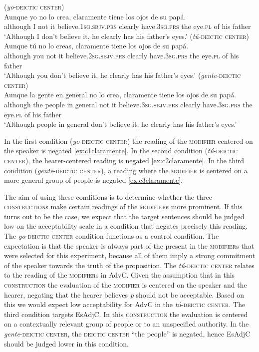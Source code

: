 \ea 
\ea\label{ex:c1claramente} (\textit{yo}-\textsc{deictic center}) \\ \gll 
Aunque yo no lo crea, claramente tiene los ojos de su papá. \\
although I not it believe.\textsc{1sg.sbjv.prs} clearly have.\textsc{3sg.prs} the eye.\textsc{pl} of his father\\
\glt `Although I don't believe it, he clearly has his father's eyes.'
\ex\label{ex:c2claramente} (\textit{tú}-\textsc{deictic center})\\ \gll 
Aunque tú no lo creas, claramente tiene los ojos de su papá. \\
although you not it believe.\textsc{2sg.sbjv.prs} clearly have.\textsc{3sg.prs} the eye.\textsc{pl} of his father\\
\glt `Although you don't believe it, he clearly has his father's eyes.'
\ex\label{ex:c3claramente}  (\textit{gente}-\textsc{deictic center}) \\ \gll 
Aunque la gente en general no lo crea, claramente tiene los ojos de su papá.\\
although the people in general not it believe.\textsc{3sg.sbjv.prs} clearly have.\textsc{3sg.prs} the eye.\textsc{pl} of his father\\
\glt `Although people in general don't believe it, he clearly has his father's eyes.'
\z
\z

In the first condition (\textit{yo}-\textsc{deictic center}) the reading of the \textsc{modifier} centered on  the speaker is negated \eqref{ex:c1claramente}. In the second condition (\textit{tú}-\textsc{deictic center}), the hearer-centered reading is negated \eqref{ex:c2claramente}. In the third condition (\textit{gente}-\textsc{deictic center}), a reading where the \textsc{modifier} is centered on a more general group of people is negated \eqref{ex:c3claramente}.\largerpage

The aim of using these conditions is to determine whether the three \textsc{construction}s  make certain readings of the \textsc{modifier}s more prominent. If this turns out to be the case, we expect that the target sentences should be judged low on the acceptability scale in a condition that negates precisely this reading. The \textit{yo}-\textsc{deictic center} condition functions as a control condition. The expectation is that the speaker is always part of the  present in the \textsc{modifier}s that were selected for this experiment, because all of them imply a strong commitment of the speaker towards the truth of the proposition. The \textit{tú}-\textsc{deictic center} relates to the reading of the \textsc{modifier}s in AdvC.  Given the assumption that in this \textsc{construction} the evaluation of the \textsc{modifier} is centered on the speaker and the hearer, negating that the hearer believes \emph{p} should not be acceptable. Based on this we would expect low acceptability for AdvC in the \textit{tú}-\textsc{deictic center}. The third condition targets EsAdjC. In this \textsc{construction} the evaluation is centered on a contextually relevant group of people or to an unspecified authority. In the \textit{gente}-\textsc{deictic center}, the \textsc{deictic center}  ``the people'' is negated, hence EsAdjC should be judged lower in this condition.

